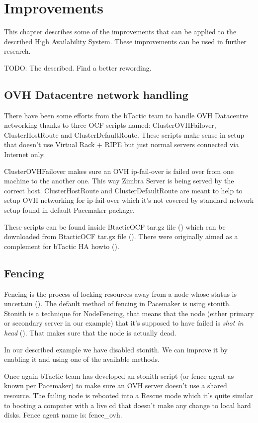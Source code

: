 

\chapter{Improvements}
This chapter describes some of the improvements that can be applied to the described High Availability System. These improvements can be used in further research.

TODO: The described. Find a better rewording.

\section {OVH Datacentre network handling}
There have been some efforts from the bTactic team to handle OVH Datacentre networking thanks to three OCF scripts named: 
ClusterOVHFailover, ClusterHostRoute and ClusterDefaultRoute. These scripts make sense in setup that doesn't use Virtual Rack + RIPE but just normal servers connected via Internet only.

ClusterOVHFailover makes sure an OVH ip-fail-over is failed over from one machine to the another one. This way Zimbra Server is being served by the correct host.
ClusterHostRoute and ClusterDefaultRoute are meant to help to setup OVH networking for ip-fail-over which it's not covered by standard network setup found in  default Pacemaker package.

These scripts can be found inside BtacticOCF tar.gz file (\cite{BtacticOCF}) which can be downloaded from BtacticOCF  tar.gz file (\cite{BtacticOrg}). There were originally aimed as a complement for bTactic HA howto (\cite{BtacticZimbraHAHowto}).

\section {Fencing}
Fencing is the process of locking resources away from a node whose status is uncertain (\cite{LinuxHAFencing}). The default method of fencing in Pacemaker is using stonith. Stonith is a technique for NodeFencing, that means that the node (either primary or secondary server in our example) that it's supposed to have failed is \textit{shot in head} (\cite{LinuxHAStonith}). That makes sure that the node is actually dead.

In our described example we have disabled stonith. We can improve it by enabling it and using one of the available methods.

Once again bTactic team has developed an stonith script (or fence agent as known per Pacemaker) to make sure an OVH server doesn't use a shared resource. The failing node is rebooted into a Rescue mode which it's quite similar to booting a computer with a live cd that doesn't make any change to local hard disks. Fence agent name is: fence\_ovh.

